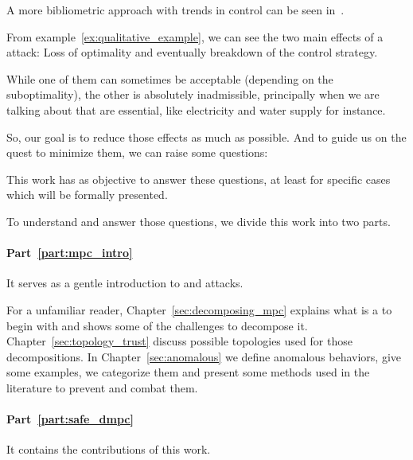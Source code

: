 \documentclass[../main.tex]{subfiles}
\begin{document}
\cite{DibajiEtAl2019}
A more bibliometric approach with trends in control can be seen in~\cite{ZacchiaEtAl2019}.


From example~\ref{ex:qualitative_example}, we can see the two main effects of a attack: Loss of optimality and eventually breakdown of the control strategy.

While one of them can sometimes be acceptable (depending on the suboptimality), the other is absolutely inadmissible, principally when we are talking about \cps{} that are essential, like electricity and water supply for instance.

So, our goal is to reduce those effects as much as possible.
And to guide us on the quest to minimize them, we can raise some questions:

This work has as objective to answer these questions, at least for specific cases which will be formally presented.

To understand and answer those questions, we divide this work into two parts.

\paragraph{Part~\ref{part:mpc_intro}} It serves as a gentle introduction to \dmpc{} and attacks.

For a unfamiliar reader, Chapter~\ref{sec:decomposing_mpc} explains what is a \mpc{} to begin with and shows some of the challenges to decompose it.
Chapter~\ref{sec:topology_trust} discuss possible topologies used for those decompositions.
In Chapter~\ref{sec:anomalous} we define anomalous behaviors, give some examples, we categorize them and present some methods used in the literature to prevent and combat them.

\paragraph{Part~\ref{part:safe_dmpc}} It contains the contributions of this work.
\end{document}
